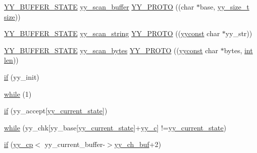 \begin{DoxyCompactItemize}
\item 
\mbox{\hyperlink{expr-lex_8cpp_a4e5bd2d129903df83f3d13effaf8f3e4}{Y\+Y\+\_\+\+B\+U\+F\+F\+E\+R\+\_\+\+S\+T\+A\+TE}} \mbox{\hyperlink{expr-lex_8cpp_af9ed770023a73cfa0b6cfd90b5a76fc9}{yy\+\_\+scan\+\_\+buffer}} \mbox{\hyperlink{expr-lex_8cpp_abe2bec50f45200479e22b18dc62fee11}{Y\+Y\+\_\+\+P\+R\+O\+TO}} ((char $\ast$base, \mbox{\hyperlink{expr-lex_8cpp_aa14cc3d400000eef0cd40225fd790cfe}{yy\+\_\+size\+\_\+t}} \mbox{\hyperlink{expr-lex_8cpp_ab7d671599a7b25ca99a487fa341bc33a}{size}}))
\item 
\mbox{\hyperlink{expr-lex_8cpp_a4e5bd2d129903df83f3d13effaf8f3e4}{Y\+Y\+\_\+\+B\+U\+F\+F\+E\+R\+\_\+\+S\+T\+A\+TE}} \mbox{\hyperlink{expr-lex_8cpp_ac0d3a22f8bc4cc5e7af2783fe375d5b0}{yy\+\_\+scan\+\_\+string}} \mbox{\hyperlink{expr-lex_8cpp_a689b8676764ac30cbf27edfb45c74391}{Y\+Y\+\_\+\+P\+R\+O\+TO}} ((\mbox{\hyperlink{expr-lex_8cpp_aa2f1a918be586b44bf08126bde2d7cc9}{yyconst}} char $\ast$yy\+\_\+str))
\item 
\mbox{\hyperlink{expr-lex_8cpp_a4e5bd2d129903df83f3d13effaf8f3e4}{Y\+Y\+\_\+\+B\+U\+F\+F\+E\+R\+\_\+\+S\+T\+A\+TE}} \mbox{\hyperlink{expr-lex_8cpp_a1171cd5559de417237e028ebb21b8e54}{yy\+\_\+scan\+\_\+bytes}} \mbox{\hyperlink{expr-lex_8cpp_a0a2ce3902c765bc21ae783522d579223}{Y\+Y\+\_\+\+P\+R\+O\+TO}} ((\mbox{\hyperlink{expr-lex_8cpp_aa2f1a918be586b44bf08126bde2d7cc9}{yyconst}} char $\ast$bytes, \mbox{\hyperlink{_util_8cpp_a0ef32aa8672df19503a49fab2d0c8071}{int}} \mbox{\hyperlink{expr-lex_8cpp_afed088663f8704004425cdae2120b9b3}{len}}))
\item 
\mbox{\hyperlink{expr-lex_8cpp_a709183e322e370a05cfdd3bb79f9ae79}{if}} (yy\+\_\+init)
\item 
\mbox{\hyperlink{expr-lex_8cpp_a8fdafe3be7e00ce3d4f0cb50a9a5eb39}{while}} (1)
\item 
\mbox{\hyperlink{expr-lex_8cpp_addae29e78f788fccdc862bf7ab200706}{if}} (yy\+\_\+accept\mbox{[}\mbox{\hyperlink{expr-lex_8cpp_abb8b9672f94e21056888ae611b41cd1b}{yy\+\_\+current\+\_\+state}}\mbox{]})
\item 
\mbox{\hyperlink{expr-lex_8cpp_a0e48c1f64b558d03d870367324920354}{while}} (yy\+\_\+chk\mbox{[}yy\+\_\+base\mbox{[}\mbox{\hyperlink{expr-lex_8cpp_abb8b9672f94e21056888ae611b41cd1b}{yy\+\_\+current\+\_\+state}}\mbox{]}+\mbox{\hyperlink{expr-lex_8cpp_a2ce7598a28e3deb63b5ef934b031a93f}{yy\+\_\+c}}\mbox{]} !=\mbox{\hyperlink{expr-lex_8cpp_abb8b9672f94e21056888ae611b41cd1b}{yy\+\_\+current\+\_\+state}})
\item 
\mbox{\hyperlink{expr-lex_8cpp_af866e536ece63dc9a073311488ba32d5}{if}} (\mbox{\hyperlink{expr-lex_8cpp_aebf8322d98e81db5af081bb22a5f06fe}{yy\+\_\+cp}}$<$ yy\+\_\+current\+\_\+buffer-\/$>$\mbox{\hyperlink{expr-lex_8cpp_a49f3339224f2ff52f9191b351b184dbd}{yy\+\_\+ch\+\_\+buf}}+2)

\end{DoxyCompactItemize}
